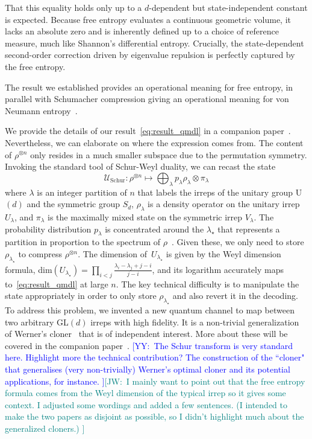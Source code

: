\documentclass[aps,pre,twocolumn,superscriptaddress,amsmath,amssymb,reprint]{revtex4-2}
\newcommand{\JW}[1]{\textcolor{teal}{[JW:\ #1]}}
\newcommand{\YY}[1]{\textcolor{blue}{[YY:\ #1]}}
\begin{document}
That this equality holds only up to a $d$-dependent but state-independent constant is expected. Because free entropy evaluates a continuous geometric volume, it lacks an absolute zero and is inherently defined up to a choice of reference measure, much like Shannon's differential entropy. Crucially, the state-dependent second-order correction driven by eigenvalue repulsion is perfectly captured by the free entropy.

The result we established provides an operational meaning for free entropy, in parallel with Schumacher compression giving an operational meaning for von Neumann entropy~\cite{schumacher1995quantum}. 

We provide the details of our result~\eqref{eq:result_qmdl} in a companion paper~\cite{paper2}. Nevertheless, we can elaborate on where the expression comes from. The content of $\rho^{\otimes n}$ only resides in a much smaller subspace due to the permutation symmetry. Invoking the standard tool of Schur-Weyl duality, we can recast the state 
\begin{equation}
    \mathcal U_\mathrm{Schur}: \rho^{\otimes n}\mapsto \bigoplus_\lambda p_\lambda \rho_\lambda\otimes \pi_\lambda
\end{equation}
where $\lambda$ is an integer partition of $n$ that labels the irreps of the unitary group U$(d)$ and the symmetric group $S_d$, $\rho_\lambda$ is a density operator on the unitary irrep~$U_\lambda$, and $\pi_\lambda$ is the maximally mixed state on the symmetric irrep $V_\lambda$. The probability distribution $p_\lambda$ is concentrated around the $\lambda_\star$ that represents a partition in proportion to the spectrum of $\rho$~\cite{keyl2001estimating}. Given these, we only need to store $\rho_{\lambda_\star}$ to compress $\rho^{\otimes n}$. The dimension of~$U_{\lambda_\star}$ is given by the Weyl dimension formula, dim$(U_{\lambda_\star}) = \prod_{i<j}\frac{\lambda_i-\lambda_j+j-i}{j-i}$, and its logarithm accurately maps to~\eqref{eq:result_qmdl} at large $n$. The key technical difficulty is to manipulate the state appropriately in order to only store $\rho_{\lambda_\star}$ and also revert it in the decoding. To address this problem, we invented a new quantum channel to map between two arbitrary GL$(d)$ irreps with high fidelity. It is a non-trivial generalization of Werner's cloner~\cite{werner1998optimal} that is of independent interest. More about these will be covered in the companion paper~\cite{paper2}. \YY{The Schur transform is very standard here. Highlight more the technical contribution? The construction of the ``cloner" that generalises (very non-trivially) Werner's optimal cloner and its potential applications, for instance. }\JW{I mainly want to point out that the free entropy formula comes from the Weyl dimension of the typical irrep so it gives some context. I adjusted some wordings and added a few sentences.  (I intended to make the two papers as disjoint as possible, so I didn't highlight much about the generalized cloners.) }
\end{document}
